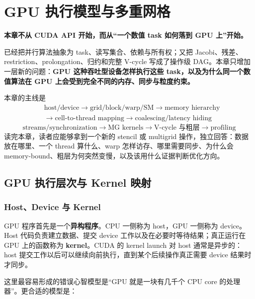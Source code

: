 \chapter{GPU 执行模型与多重网格}
\label{ch:gpu}

\begin{keybox}
\textbf{本章不从 CUDA API 开始，而从“一个数值 task 如何落到 GPU 上”开始。}

已经把并行算法抽象为 task、读写集合、依赖与所有权；又把 Jacobi、残差、restriction、prolongation、归约和完整 V-cycle 写成了操作级 DAG。本章只增加一层新的问题：\textbf{GPU 这种吞吐型设备怎样执行这些 task，以及为什么同一个数值算法在 GPU 上会受到完全不同的内存、同步与粒度约束。}

本章的主线是
\[
\boxed{
\begin{aligned}
&\text{host/device}
\rightarrow
\text{grid/block/warp/SM}
\rightarrow
\text{memory hierarchy}\\
&\rightarrow
\text{cell-to-thread mapping}
\rightarrow
\text{coalescing/latency hiding}
\end{aligned}}
\]
\[
\boxed{
\text{streams/synchronization}
\rightarrow
\text{MG kernels}
\rightarrow
\text{V-cycle 与粗层}
\rightarrow
\text{profiling}
}
\]
读完本章，读者应能够拿到一个新的 stencil 或 multigrid 操作，独立回答：数据放在哪里、一个 thread 算什么、warp 怎样访存、哪里需要同步、为什么会 memory-bound、粗层为何突然变慢，以及该用什么证据判断优化方向。
\end{keybox}

\section{GPU 执行层次与 Kernel 映射}
\label{sec:gpu-task-to-kernel}

\subsection{Host、Device 与 Kernel}

GPU 程序首先是一个\textbf{异构程序}。CPU 一侧称为 host，GPU 一侧称为 device。Host 代码负责建立数据、提交 device 工作以及在必要时等待结果；真正运行在 GPU 上的函数称为 \textbf{kernel}。CUDA 的 kernel launch 对 host 通常是异步的：host 提交工作以后可以继续向前执行，直到某个后续操作真正需要 device 结果时才同步\cite{cudaProgramming2026}。

这里最容易形成的错误心智模型是“GPU 就是一块有几千个 CPU core 的处理器”。更合适的模型是：

